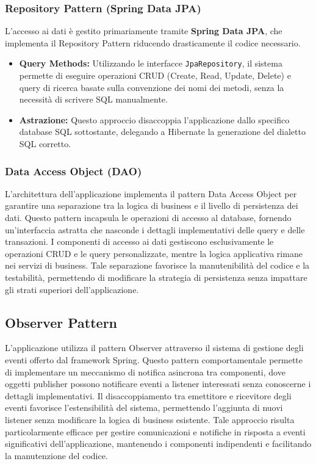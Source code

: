 \documentclass{report}
\begin{document}
\subsubsection{Repository Pattern (Spring Data JPA)}
L'accesso ai dati è gestito primariamente tramite \textbf{Spring Data JPA}, che implementa il Repository Pattern riducendo drasticamente il codice necessario.
\begin{itemize}
    \item \textbf{Query Methods:} Utilizzando le interfacce \texttt{JpaRepository}, il sistema permette di eseguire operazioni CRUD (Create, Read, Update, Delete) e query di ricerca basate sulla convenzione dei nomi dei metodi, senza la necessità di scrivere SQL manualmente.
    \item \textbf{Astrazione:} Questo approccio disaccoppia l'applicazione dallo specifico database SQL sottostante, delegando a Hibernate la generazione del dialetto SQL corretto.
\end{itemize}

\subsubsection{Data Access Object (DAO)}
L'architettura dell'applicazione implementa il pattern Data Access Object per garantire una separazione tra la logica di business e il livello di persistenza dei dati. Questo pattern incapsula le operazioni di accesso al database, fornendo un'interfaccia astratta che nasconde i dettagli implementativi delle query e delle transazioni. I componenti di accesso ai dati gestiscono esclusivamente le operazioni CRUD e le query personalizzate, mentre la logica applicativa rimane nei servizi di business. Tale separazione favorisce la manutenibilità del codice e la testabilità, permettendo di modificare la strategia di persistenza senza impattare gli strati superiori dell'applicazione.


\subsection{Observer Pattern}

L'applicazione utilizza il pattern Observer attraverso il sistema di gestione degli eventi offerto dal framework Spring. Questo pattern comportamentale permette di implementare un meccanismo di notifica asincrona tra componenti, dove oggetti publisher possono notificare eventi a listener interessati senza conoscerne i dettagli implementativi. Il disaccoppiamento tra emettitore e ricevitore degli eventi favorisce l'estensibilità del sistema, permettendo l'aggiunta di nuovi listener senza modificare la logica di business esistente. Tale approccio risulta particolarmente efficace per gestire comunicazioni e notifiche in risposta a eventi significativi dell'applicazione, mantenendo i componenti indipendenti e facilitando la manutenzione del codice.
\end{document}
